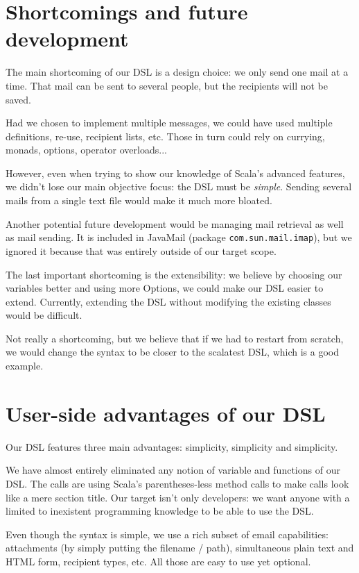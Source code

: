 \documentclass[10pt,a4paper]{article}
\begin{document}
\section{Shortcomings and future development}

	The main shortcoming of our DSL is a design choice: we only send one mail at a time. That mail can be sent to several people, but the recipients will not be saved.
	
	Had we chosen to implement multiple messages, we could have used multiple definitions, re-use, recipient lists, etc. Those in turn could rely on currying, monads, options, operator overloads...
	
	However, even when trying to show our knowledge of Scala's advanced features, we didn't lose our main objective focus: the DSL must be \textit{simple}. Sending several mails from a single text file would make it much more bloated.
	
	\vskip 10pt
	Another potential future development would be managing mail retrieval as well as mail sending. It is included in JavaMail (package \texttt{com.sun.mail.imap}), but we ignored it because that was entirely outside of our target scope.
	
	\vskip 10pt
	The last important shortcoming is the extensibility: we believe by choosing our variables better and using more Options, we could make our DSL easier to extend. Currently, extending the DSL without modifying the existing classes would be difficult.
	
	\vskip 10pt
	Not really a shortcoming, but we believe that if we had to restart from scratch, we would change the syntax to be closer to the scalatest DSL, which is a good example.

\section{User-side advantages of our DSL}

	Our DSL features three main advantages: simplicity, simplicity and simplicity.
	
	We have almost entirely eliminated any notion of variable and functions of our DSL. The calls are using Scala's parentheses-less method calls to make calls look like a mere section title. Our target isn't only developers: we want anyone with a limited to inexistent programming knowledge to be able to use the DSL.
	
	Even though the syntax is simple, we use a rich subset of email capabilities: attachments (by simply putting the filename / path), simultaneous plain text and HTML form, recipient types, etc. All those are easy to use yet optional.
	
\end{document}
